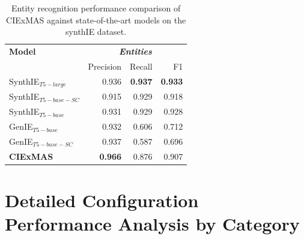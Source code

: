 \documentclass[a4paper,oneside,bibliography=totoc]{scrbook}
\begin{document}
\begin{table}[h]
  \centering
  \begin{tabular}{l|rrr}
    \toprule
    \textbf{Model}         & \multicolumn{3}{c}{\textit{\textbf{Entities}}}                                   \\
                           & Precision                                      & Recall         & F1             \\
    \midrule
    SynthIE$_{T5-large}$   & 0.936                                          & \textbf{0.937} & \textbf{0.933} \\
    SynthIE$_{T5-base-SC}$ & 0.915                                          & 0.929          & 0.918          \\
    SynthIE$_{T5-base}$    & 0.931                                          & 0.929          & 0.928          \\
    GenIE$_{T5-base}$      & 0.932                                          & 0.606          & 0.712          \\
    GenIE$_{T5-base-SC}$   & 0.937                                          & 0.587          & 0.696          \\
    \midrule
    \textbf{CIExMAS}       & \textbf{0.966}                                 & 0.876          & 0.907          \\
    \bottomrule
  \end{tabular}
  \caption{Entity recognition performance comparison of CIExMAS against state-of-the-art models on the synthIE dataset.}
  \label{tab:evaluation_entities}
\end{table}



\clearpage
\section{Detailed Configuration Performance Analysis by Category}
\label{sec:config_performance_analysis}
\end{document}
